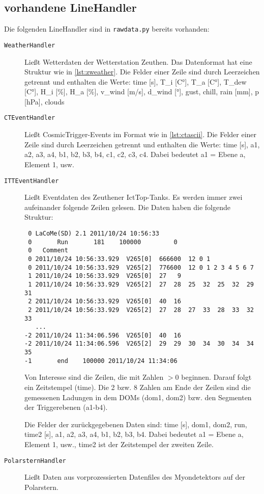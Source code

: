 \documentclass[version=last,
	a4paper,			%
	pagesize, 			%
	11pt,				%
	BCOR1cm,			%
	DIV12,	 			%
	pointlessnumbers,   %
	halfparskip,		%
]{scrreprt}
\begin{document}
\subsection{vorhandene LineHandler}
Die folgenden LineHandler sind in \texttt{rawdata.py} bereits vorhanden:
\begin{description}
  \item[\texttt{WeatherHandler}] Ließt Wetterdaten der Wetterstation Zeuthen. Das Datenformat hat eine Struktur wie in \autoref{lst:zweather}. Die Felder einer Zeile sind durch Leerzeichen getrennt und enthalten die Werte:
      \textsf{time [s], T\_i [C°], T\_a [C°], T\_dew [C°], H\_i [\%], H\_a [\%], v\_wind [m/s], d\_wind [°], gust, chill, rain [mm], p [hPa], clouds}
  \item[\texttt{CTEventHandler}] Ließt CosmicTrigger-Events im Format wie in \autoref{lst:ctascii}. Die Felder einer Zeile sind durch Leerzeichen getrennt und enthalten die Werte: \textsf{time [s], a1, a2, a3, a4, b1, b2, b3, b4, c1, c2, c3, c4}. Dabei bedeutet \textsf{a1} = Ebene a, Element 1, usw.
  \item[\texttt{ITTEventHandler}] Ließt Eventdaten des Zeuthener IctTop-Tanks. Es werden immer zwei aufeinander folgende Zeilen gelesen. Die Daten haben die folgende Struktur:
      \begin{lstlisting}
 0 LaCoMe(SD) 2.1 2011/10/24 10:56:33
 0       Run       181    100000         0
 0   Comment
 0 2011/10/24 10:56:33.929  V265[0]  666600  12 0 1
 0 2011/10/24 10:56:33.929  V265[2]  776600  12 0 1 2 3 4 5 6 7
 1 2011/10/24 10:56:33.929  V265[0]  27   9
 1 2011/10/24 10:56:33.929  V265[2]  27  28  25  32  25  32  29  31
 2 2011/10/24 10:56:33.929  V265[0]  40  16
 2 2011/10/24 10:56:33.929  V265[2]  27  28  27  33  28  33  32  33
   ...
-2 2011/10/24 11:34:06.596  V265[0]  40  16
-2 2011/10/24 11:34:06.596  V265[2]  29  29  30  34  30  34  34  35
-1       end    100000 2011/10/24 11:34:06

      \end{lstlisting}
      Von Interesse sind die Zeilen, die mit Zahlen $>0$ beginnen. Darauf folgt ein Zeitstempel (\textsf{time}). Die 2 bzw. 8 Zahlen am Ende der Zeilen sind die gemessenen Ladungen in dem DOMs (\textsf{dom1, dom2}) bzw. den Segmenten der Triggerebenen (\textsf{a1-b4}).

      Die Felder der zurückgegebenen Daten sind: \textsf{time [s], dom1, dom2, run, time2 [s], a1, a2, a3, a4, b1, b2, b3, b4}.
      Dabei bedeutet \textsf{a1} = Ebene a, Element 1, usw., \textsf{time2} ist der Zeitstempel der zweiten Zeile.
  \item[\texttt{PolarsternHandler}] Ließt Daten aus vorprozessierten Datenfiles des Myondetektors auf der Polarstern.
\end{description}
\end{document}
